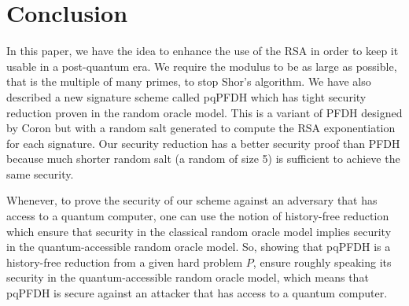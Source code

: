 \documentclass[a4paper,11pt]{article}
\begin{document}
\section{Conclusion}
In this paper, we have the idea to enhance the use of the RSA in order to keep it usable in a post-quantum era. We require  the modulus to be as large as possible, that is the multiple of many primes, to stop Shor's algorithm. 
We have also described a new signature scheme called pqPFDH which has tight security reduction proven in the random oracle model. This is a variant of PFDH designed by Coron but with a random salt generated to compute the RSA exponentiation for each signature. Our security reduction has a better security proof than PFDH because much shorter random salt (a random of size 5) is sufficient to achieve the same security. 

Whenever, to prove the security of our scheme against an adversary that has access to a quantum computer, one can use the notion of history-free reduction which ensure that security in the classical random oracle model implies security in the quantum-accessible random oracle model.
So, showing that pqPFDH is a history-free reduction from a given hard problem $P$, ensure  roughly speaking its security in the  quantum-accessible random oracle model, which means that pqPFDH is secure against an attacker that has access to a quantum computer. 
\end{document}
